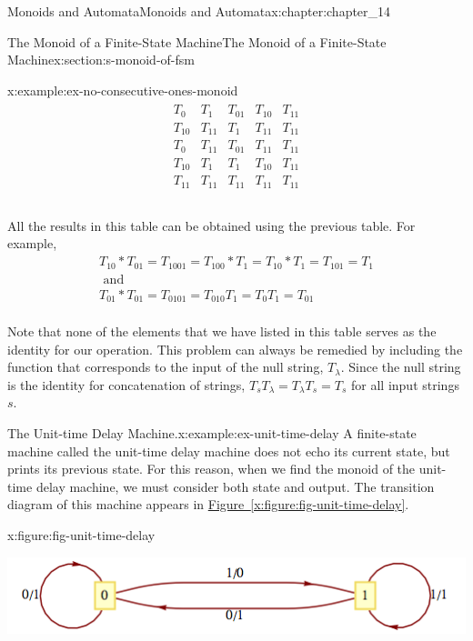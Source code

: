 \documentclass[oneside,10pt,]{book}
\newcommand{\xreffont}{\relax}
\numberwithin{equation}{section}
\begin{document}
\begin{chapterptx}{Monoids and Automata}{}{Monoids and Automata}{}{}{x:chapter:chapter_14}
\begin{sectionptx}{The Monoid of a Finite-State Machine}{}{The Monoid of a Finite-State Machine}{}{}{x:section:s-monoid-of-fsm}
\begin{example}{}{x:example:ex-no-consecutive-ones-monoid}
\begin{equation*}
\begin{array}{c|c}
\begin{array}{ccccc}
T_0 & T_1 & T_{01} & T_{10} & T_{11} \\
T_{10} & T_{11} & T_1 & T_{11} & T_{11} \\
T_0 & T_{11} & T_{01} & T_{11} & T_{11} \\
T_{10} & T_1 & T_1 & T_{10} & T_{11} \\
T_{11} & T_{11} & T_{11} & T_{11} & T_{11} \\
\end{array}
\\
\end{array}
\end{equation*}
%
\par
All the results in this table can be obtained using the previous table. For example,%
\begin{equation*}
\begin{array}{c}
T_{10}*T_{01}=T_{1001}=T_{100}*T_1=T_{10}*T_1=T_{101}=T_1\\
\textrm{ and} \\
T_{01}*T_{01}=T_{0101}=T_{010}T_1=T_0T_1=T_{01}\\
\end{array}
\end{equation*}
%
\par
Note that none of the elements that we have listed in this table serves as the identity for our operation. This problem can always be remedied by including the function that corresponds to the input of the null string, \(T_{\lambda }\). Since the null string is the identity for concatenation of strings, \(T_sT_{\lambda }=T_{\lambda }T_s=T_s\) for all input strings \(s\).%
\end{example}
\begin{example}{The Unit-time Delay Machine.}{x:example:ex-unit-time-delay}%
A finite-state machine called the unit-time delay machine does not echo its current state, but prints its previous state. For this reason, when we find the monoid of the unit-time delay machine, we must consider both state and output. The transition diagram of this machine appears in \hyperref[x:figure:fig-unit-time-delay]{Figure~{\xreffont\ref{x:figure:fig-unit-time-delay}}}.%
\begin{figureptx}{}{x:figure:fig-unit-time-delay}{}%
\begin{image}{0.15}{0.7}{0.15}%
\includegraphics[width=\linewidth]{images/fig-unit-time-delay.png}

\end{image}
\end{figureptx}
\end{example}
\end{sectionptx}
\end{chapterptx}
\end{document}
